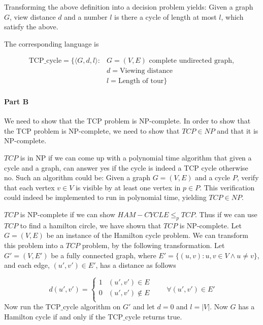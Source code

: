 \documentclass[10pt]{article}
\begin{document}
Transforming the above definition into a decision problem yields: Given a graph $G$, view distance $d$ and a number $l$ is there a cycle of length at most $l$, which satisfy the above.

The corresponding language is

\begin{align*}
   \text{TCP_cycle} = \{ \langle G, d, l \rangle : &G = (V,E) \text{ complete undirected graph},\\ 
                                                   &d = \text{Viewing distance}  \\
                                                   &l = \text{Length of tour}  \}
\end{align*}


\paragraph{Part B} %
\label{par:part_b}
We need to show that the TCP problem is NP-complete. In order to show that the TCP problem is NP-complete, we need to show that $TCP \in NP$ and that it is NP-complete. 

$TCP$ is in NP if we can come up with a polynomial time algorithm that given a cycle and a graph, can answer yes if the cycle is indeed a TCP cycle otherwise no. Such an algorithm could be: Given a graph $G=(V,E)$ and a cycle $P$, verify that each vertex $v \in V$ is visible by at least one vertex in $p \in P$. This verification could indeed be implemented to run in polynomial time, yielding $TCP \in NP$.

$TCP$ is NP-complete if we can show $HAM-CYCLE \leq_p TCP$. Thus if we can use $TCP$ to find a hamilton circle, we have shown that $TCP$ is NP-complete. Let $G = (V, E)$ be an instance of the Hamilton cycle problem. We can transform this problem into a $TCP$ problem, by the following transformation. Let $G' = (V, E')$ be a fully connected graph, where $E' = \{(u,v) : u,v \in V \wedge u \neq v\}$, and each edge, $(u',v') \in E'$, has a distance as follows

\begin{equation} 
d(u',v')  = 
\left\{
\begin{array}{rl} 
  1 & (u',v') \in E\\
  0 & (u',v') \notin E\\ 
\end{array} 
\right. \qquad \forall (u',v') \in E'
\end{equation} 
Now run the $\text{TCP_cycle}$ algorithm on $G'$ and let $d=0$ and $l = |V|$. Now $G$ has a Hamilton cycle if and only if the $\text{TCP_cycle}$ returns true.
\end{document}

